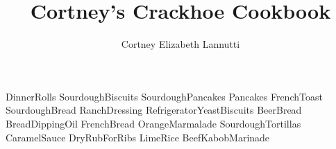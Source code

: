 \documentclass[a4paper, titlepage]{book}
\title{Cortney's Crackhoe Cookbook}
\author{Cortney Elizabeth Lannutti}
\date{}
\begin{document}
\maketitle
{}
\tableofcontents
\newpage
{}

{DinnerRolls}
{SourdoughBiscuits}
{SourdoughPancakes}
{Pancakes}
{FrenchToast}
{SourdoughBread}
{RanchDressing}
{RefrigeratorYeastBiscuits}
{BeerBread}
{BreadDippingOil}
{FrenchBread}
{OrangeMarmalade}
{SourdoughTortillas}
{CaramelSauce}
{DryRubForRibs}
{LimeRice}
{BeefKabobMarinade}
\end{document}

